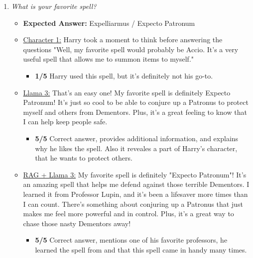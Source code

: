 \documentclass[fleqn,moreauthors,10pt]{ds_report}
\begin{document}
\begin{appendices}
\begin{enumerate}
            \item \textit{What is your favorite spell?}
            \begin{itemize}
                \item \textbf{Expected Answer:} Expelliarmus / Expecto Patronum
                \item \underline{Character 1:} Harry took a moment to think before answering the questions "Well, my favorite spell would probably be Accio. It's a very useful spell that allows me to summon items to myself."
                \begin{itemize}
                    \item \textbf{1/5} Harry used this spell, but it's definitely not his go-to.
                \end{itemize}
                \item \underline{Llama 3:} That's an easy one! My favorite spell is definitely Expecto Patronum! It's just so cool to be able to conjure up a Patronus to protect myself and others from Dementors. Plus, it's a great feeling to know that I can help keep people safe.
                \begin{itemize}
                    \item \textbf{5/5}  Correct answer, provides additional information, and explains why he likes the spell. Also it reveales a part of Harry's character, that he wants to protect others.
                \end{itemize}
                \item \underline{RAG + Llama 3:} My favorite spell is definitely "Expecto Patronum"! It's an amazing spell that helps me defend against those terrible Dementors. I learned it from Professor Lupin, and it's been a lifesaver more times than I can count. There's something about conjuring up a Patronus that just makes me feel more powerful and in control. Plus, it's a great way to chase those nasty Dementors away!
                 \begin{itemize}
                    \item \textbf{5/5} Correct answer, mentions one of his favorite professors, he learned the spell from and that this spell came in handy many times.
                \end{itemize}
            \end{itemize}
        

\end{enumerate}
\end{appendices}
\end{document}
